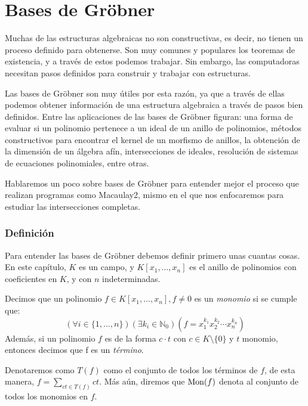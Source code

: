 \chapter{Bases de Gröbner}

Muchas de las estructuras algebraicas no son constructivas, es decir, no tienen un proceso definido para obtenerse. Son muy comunes y populares los teoremas de existencia, y a través de estos podemos trabajar. Sin embargo, las computadoras necesitan pasos definidos para construir y trabajar con estructuras. 

Las bases de Gröbner son muy útiles por esta razón, ya que a través de ellas podemos obtener información de una estructura algebraica a través de pasos bien definidos. Entre las aplicaciones de las bases de Gröbner figuran: una forma de evaluar si un polinomio pertenece a un ideal de un anillo de polinomios, métodos constructivos para encontrar el kernel de un morfismo de anillos, la obtención de la dimensión de un álgebra afín, intersecciones de ideales, resolución de sistemas de ecuaciones polinomiales, entre otras.

Hablaremos un poco sobre bases de Gröbner para entender mejor el proceso que realizan programas como Macaulay2, mismo en el que nos enfocaremos para estudiar las intersecciones completas.

\subsection{Definición}

Para entender las bases de Gröbner debemos definir primero unas cuantas cosas. En este capítulo, $K$ es un campo, y $K[x_1, \dots , x_n]$ es el anillo de polinomios con coeficientes en $K$, y con $n$ indeterminadas. 

\begin{definition}Decimos que un polinomio $f \in K[x_1, \dots, x_n], f \neq 0$ es un \emph{monomio} si se cumple que: 
$$ (\forall i \in \{1,\dots,n\})(\exists k_i \in \mathbb{N}_0)(f = x_1^{k_1}x_2^{k_2}\cdots x_n^{k_n}) $$
Además, si un polinomio $f$ es de la forma $c\cdot t$ con $c \in K\setminus \{0\}$ y $t$ monomio, entonces decimos que f es un \emph{término}.\end{definition}

Denotaremos como $T(f)$ como el conjunto de todos los términos de $f$, de esta manera, $f = \sum_{ct \in T(f)} ct$. Más aún, diremos que $\textrm{Mon}(f)$ denota al conjunto de todos los monomios en $f$.

